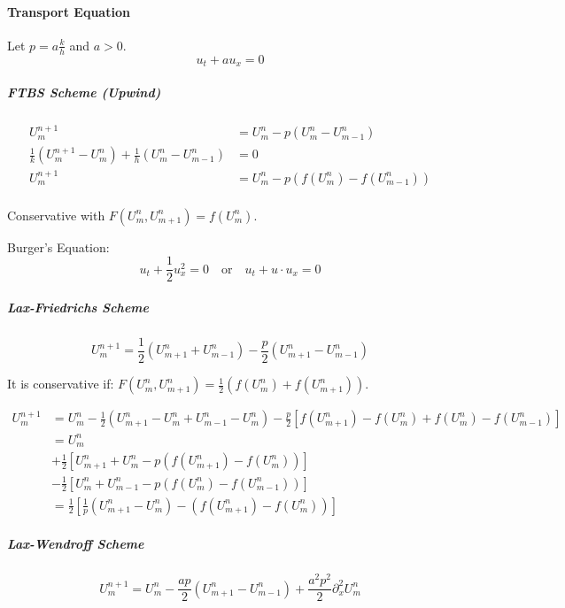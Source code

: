 \paragraph{Transport Equation}
Let \(p = a \frac{k}{h} \) and \(a > 0\).
\[
  u_t + a u_x = 0
\]
\subparagraph{FTBS Scheme (Upwind)}
\begin{align*}
  U_m^{n+1}                                                                               & = U_m^n - p(U_m^n - U_{m-1}^n)       \\
  \frac{1}{k} \left(U_m^{n+1} - U_m^n\right) + \frac{1}{h} \left(U_m^n - U_{m-1}^n\right) & = 0                                  \\
  U_m^{n+1}                                                                               & = U_m^n - p(f(U_m^n) - f(U_{m-1}^n)) \\
\end{align*}

Conservative with \(F(U_m^n, U_{m+1}^n) = f(U_m^n)\).

Burger's Equation:
\[
  u_t + \frac{1}{2}u^2_x = 0 \quad \text{or} \quad u_t + u \cdot u_x = 0
\]

\subparagraph{Lax-Friedrichs Scheme}
\[
  U_m^{n+1} = \frac{1}{2}(U_{m+1}^n + U_{m-1}^n) - \frac{p}{2}(U_{m+1}^n - U_{m-1}^n)
\]

It is conservative if: \(F(U_m^n, U_{m+1}^n) = \frac{1}{2}(f(U_m^n) + f(U_{m+1}^n))\).

\begin{align*}
  U_m^{n+1} & = U_m^n - \frac{1}{2}\left(U_{m+1}^n - U_m^n + U_{m-1}^n - U_m^n\right) - \frac{p}{2}\left[f(U_{m+1}^n) - f(U_m^n) + f(U_m^n) - f(U_{m-1}^n)\right] \\
            & = U_m^n                                                                                                                                             \\
            & + \frac{1}{2}\left[U_{m+1}^n + U_m^n - p\left(f(U_{m+1}^n) - f(U_m^n)\right)\right]                                                                 \\
            & - \frac{1}{2}\left[U_m^n + U_{m-1}^n - p\left(f(U_m^n) - f(U_{m-1}^n)\right)\right]                                                                 \\
            & = \frac{1}{2}\left[\frac{1}{p} \left(U_{m+1}^n - U_m^n\right) - \left(f(U_{m+1}^n) - f(U_m^n)\right) \right]
\end{align*}

\subparagraph{Lax-Wendroff Scheme}
\[
  U_m^{n+1} = U_m^n - \frac{ap}{2}(U_{m+1}^n - U_{m-1}^n) + \frac{a^2p^2}{2} \partial_x^2 U_m^n
\]

